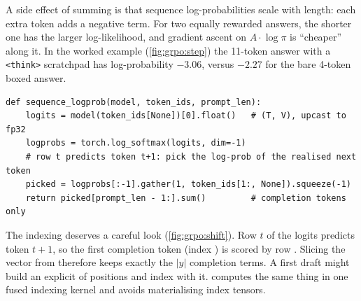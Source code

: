 A side effect of summing is that sequence log-probabilities scale with length: each extra
token adds a negative term. For two equally rewarded answers, the shorter one has the
larger log-likelihood, and gradient ascent on $A\cdot\log\pi$ is ``cheaper'' along it. In the
worked example (\cref{fig:grpo:step}) the 11-token answer with a \verb|<think>| scratchpad has
log-probability $-3.06$, versus $-2.27$ for the bare 4-token boxed answer.

\begin{lstlisting}[caption={Differentiable sequence log-probability. \texttt{gather} picks, for every position, the log-prob of the token that actually came next.},label={lst:grpo:seqlp}]
def sequence_logprob(model, token_ids, prompt_len):
    logits = model(token_ids[None])[0].float()   # (T, V), upcast to fp32
    logprobs = torch.log_softmax(logits, dim=-1)
    # row t predicts token t+1: pick the log-prob of the realised next token
    picked = logprobs[:-1].gather(1, token_ids[1:, None]).squeeze(-1)
    return picked[prompt_len - 1:].sum()         # completion tokens only
\end{lstlisting}

The indexing deserves a careful look (\cref{fig:grpo:shift}). Row $t$ of the logits
predicts token $t+1$, so the first completion token (index ) is scored by
row . Slicing the  vector from  therefore
keeps exactly the $|y|$ completion terms. A first draft might build an explicit
 of positions and index with it.  computes the same thing in
one fused indexing kernel and avoids materialising index tensors.

